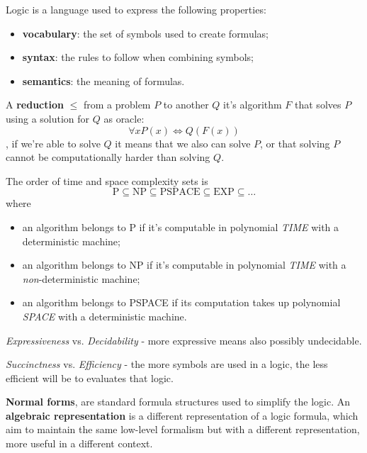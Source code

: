 \documentclass[oneside]{academica}
\begin{document}
Logic is a language used to express the following properties:
\begin{itemize}
  \item \textbf{vocabulary}: the set of symbols used to create formulas;
  \item \textbf{syntax}: the rules to follow when combining symbols;
  \item \textbf{semantics}: the meaning of formulas.
\end{itemize}

\begin{definition*}[Reduction]
  A \textbf{reduction} $\leq$ from a problem $P$ to another $Q$ it's algorithm $F$ that solves $P$ using a solution for $Q$ as oracle:
  \begin{equation*}
    \forall x P(x) \iff Q\left(F(x)\right)
  \end{equation*}
  \ie, if we're able to solve $Q$ it means that we also can solve $P$, or that solving $P$ cannot be computationally harder than solving $Q$.
\end{definition*}

The order of time and space complexity sets is
\begin{equation*}
  \text{P} \subseteq \text{NP} \subseteq \text{PSPACE} \subseteq \text{EXP} \subseteq \dots
\end{equation*}
where
\begin{itemize}
  \item an algorithm belongs to P if it's computable in polynomial \textit{TIME} with a deterministic machine;
  \item an algorithm belongs to NP if it's computable in polynomial \textit{TIME} with a \emph{non}-de\-ter\-mi\-ni\-stic machine;
  \item an algorithm belongs to PSPACE if its computation takes up polynomial \textit{SPACE} with a deterministic machine.
\end{itemize}

\textit{Expressiveness} vs. \textit{Decidability} - more expressive means also possibly undecidable.

\textit{Succinctness} vs. \textit{Efficiency} - the more symbols are used in a logic, the less efficient will be to evaluates that logic.

\textbf{Normal forms}, are standard formula structures used to simplify the logic.
An \textbf{algebraic representation} is a different representation of a logic formula, which aim to maintain the same low-level formalism but with a different representation, more useful in a different context.
\end{document}
